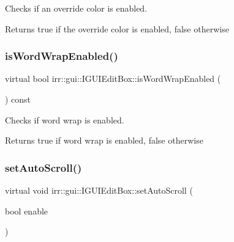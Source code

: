 Checks if an override color is enabled. 

\begin{DoxyReturn}{Returns}
true if the override color is enabled, false otherwise 
\end{DoxyReturn}
\mbox{\label{classirr_1_1gui_1_1IGUIEditBox_ad0fd4782c052341744ea9d1f61f80e01}} 
\subsubsection{\texorpdfstring{is\+Word\+Wrap\+Enabled()}{isWordWrapEnabled()}}
{\footnotesize\ttfamily virtual bool irr\+::gui\+::\+I\+G\+U\+I\+Edit\+Box\+::is\+Word\+Wrap\+Enabled (\begin{DoxyParamCaption}{ }\end{DoxyParamCaption}) const\hspace{0.3cm}{\ttfamily [pure virtual]}}



Checks if word wrap is enabled. 

\begin{DoxyReturn}{Returns}
true if word wrap is enabled, false otherwise 
\end{DoxyReturn}
\mbox{\label{classirr_1_1gui_1_1IGUIEditBox_ad0a9db6da9d0594bb3b5b85a673b3e4d}} 
\subsubsection{\texorpdfstring{set\+Auto\+Scroll()}{setAutoScroll()}}
{\footnotesize\ttfamily virtual void irr\+::gui\+::\+I\+G\+U\+I\+Edit\+Box\+::set\+Auto\+Scroll (\begin{DoxyParamCaption}\item[{bool}]{enable }\end{DoxyParamCaption})\hspace{0.3cm}{\ttfamily [pure virtual]}}



